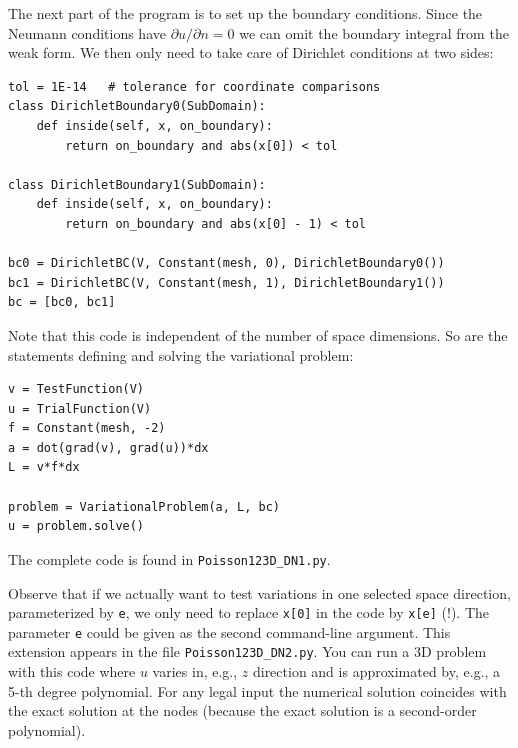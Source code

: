 The next part of the program is to set up the boundary conditions.
Since the Neumann conditions have $\partial u/\partial n=0$ we can
omit the boundary integral from the weak form. We then only
need to take care of Dirichlet conditions at two sides:
\begin{Verbatim}[fontsize=\fontsize{10pt}{10pt},tabsize=8,baselinestretch=1.05,
fontfamily=tt,xleftmargin=7mm]
tol = 1E-14   # tolerance for coordinate comparisons
class DirichletBoundary0(SubDomain):
    def inside(self, x, on_boundary):
        return on_boundary and abs(x[0]) < tol

class DirichletBoundary1(SubDomain):
    def inside(self, x, on_boundary):
        return on_boundary and abs(x[0] - 1) < tol

bc0 = DirichletBC(V, Constant(mesh, 0), DirichletBoundary0())
bc1 = DirichletBC(V, Constant(mesh, 1), DirichletBoundary1())
bc = [bc0, bc1]
\end{Verbatim}
\noindent
Note that this code is independent of the number of space dimensions.
So are the statements defining and solving
the variational problem:
\begin{Verbatim}[fontsize=\fontsize{10pt}{10pt},tabsize=8,baselinestretch=1.05,
fontfamily=tt,xleftmargin=7mm]
v = TestFunction(V)
u = TrialFunction(V)
f = Constant(mesh, -2)
a = dot(grad(v), grad(u))*dx
L = v*f*dx

problem = VariationalProblem(a, L, bc)
u = problem.solve()
\end{Verbatim}
\noindent
The complete code is found in {\fontsize{12pt}{12pt}\verb!Poisson123D_DN1.py!}.

Observe that if we actually want to test variations in one selected
space direction, parameterized by {\fontsize{12pt}{12pt}\texttt{e}}, we only need to
replace {\fontsize{12pt}{12pt}\texttt{x[0]}} in the code by {\fontsize{12pt}{12pt}\texttt{x[e]}} (!). The parameter
{\fontsize{12pt}{12pt}\texttt{e}} could be given as the second command-line argument.
This extension appears in the file {\fontsize{12pt}{12pt}\verb!Poisson123D_DN2.py!}.
You can run a 3D problem with this code where $u$ varies in, e.g.,
$z$ direction and is approximated by, e.g., a 5-th degree polynomial.
For any legal input the numerical solution coincides with the
exact solution at the nodes (because the exact solution is a second-order
polynomial).


%
%

